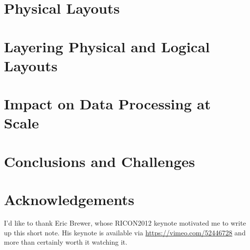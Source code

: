 \documentclass{llncs}
\begin{document}
\section{Physical Layouts}
\label{sec:phylay}

\section{Layering Physical and Logical Layouts}
\label{sec:laylay}


\section{Impact on Data Processing at Scale}
\label{sec:ldp}


\section{Conclusions and Challenges}
\label{sec:concl}

\section{Acknowledgements}
\label{sec:ack}
I'd like to thank Eric Brewer, whose RICON2012 keynote motivated me to write up
this short note. His keynote is available via \url{https://vimeo.com/52446728} 
and more than certainly worth it watching it.



\end{document}
